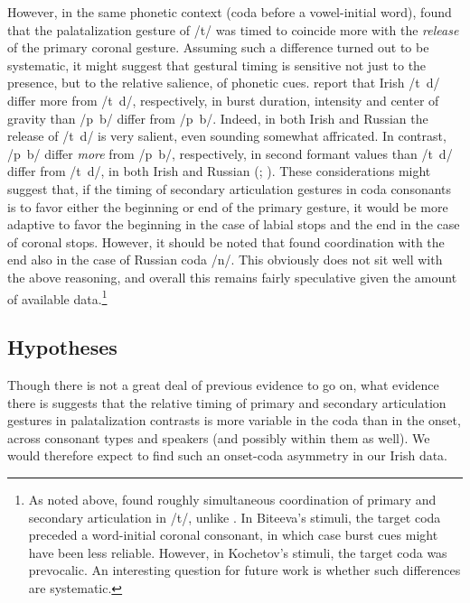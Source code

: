 \documentclass[output=paper,colorlinks,citecolor=brown]{langscibook}
\newcommand{\pal}{\ipa{ʲ}}
\newcommand{\vel}{\ipa{ˠ}}
\begin{document}
However, in the same phonetic context (coda before a vowel-initial word), \citet{Kochetov2009_Russian_C_variation} found that the palatalization gesture of /t\pal/ was timed to coincide more with the \emph{release} of the primary coronal gesture. Assuming such a difference turned out to be systematic, it might suggest that gestural timing is sensitive not just to the presence, but to the relative salience, of phonetic cues. \citet{NiChiosain_Padgett2012_Irish_pal_acous_percep} report that Irish /t\pal\ d\pal/ differ more from /t\vel\ d\vel/, respectively, in burst duration, intensity and center of gravity than /p\pal\ b\pal/ differ from /p\vel\ b\vel/. Indeed, in both Irish and Russian the release of /t\pal\ d\pal/ is very salient, even sounding somewhat affricated. In contrast, /p\pal\ b\pal/ differ \emph{more} from /p\vel\ b\vel/, respectively, in second formant values than /t\pal\ d\pal/ differ from /t\vel\ d\vel/, in both Irish and Russian (\cite{Purcell:1979}; \cite{NiChiosain_Padgett2012_Irish_pal_acous_percep}). These considerations might suggest that, if the timing of secondary articulation gestures in coda consonants is to favor either the beginning or end of the primary gesture, it would be more adaptive to favor the beginning in the case of labial stops and the end in the case of coronal stops. However, it should be noted that \citet{Kochetov2009_Russian_C_variation} found coordination with the end also in the case of Russian coda /n\pal/. This obviously does not sit well with the above reasoning, and overall this remains fairly speculative given the amount of available data.\footnote{As noted above, \citet{Biteeva2021_Russian_palatals_PhD} found roughly simultaneous coordination of primary and secondary articulation in /t\pal/, unlike \citet{Kochetov2009_Russian_C_variation}. In Biteeva's stimuli, the target coda preceded a word-initial coronal consonant, in which case burst cues might have been less reliable. However, in Kochetov's stimuli, the target coda was prevocalic. An interesting question for future work is whether such differences are systematic.}
 
\subsection{Hypotheses}\label{sec:hypotheses}
Though there is not a great deal of previous evidence to go on, what evidence there is suggests that the relative timing of primary and secondary articulation gestures in palatalization contrasts is more variable in the coda than in the onset, across consonant types and speakers (and possibly within them as well). We would therefore expect to find such an onset-coda asymmetry in our Irish data.
\end{document}
